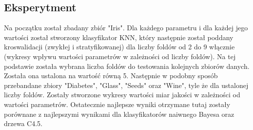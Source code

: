     \subsection{Eksperytment}
        Na początku został zbadany zbiór "Iris". Dla każdego parametru i dla każdej jego wartości został
        stworzony klasyfikator KNN, który następnie został poddany kroswalidacji (zwykłej i stratyfikowanej)
        dla liczby foldów od 2 do 9 włącznie (wykresy wpływu wartości parametrów w zależności od liczby foldów).
        Na tej podstawie została wybrana liczba foldów do testowania kolejnych zbiorów danych. Została ona ustalona
        na wartość równą 5. Następnie w podobny sposób przebandane zbiory "Diabetes", "Glass", "Seeds" oraz "Wine",
        tyle że dla ustalonej liczby foldów. Zostały stworzone wykresy wartości miar jakości w zależności od wartości
        parametrów. Ostatecznie najlepsze wyniki otrzymane tutaj zostały porównane z najlepszymi wynikami dla klasyfikatorów
        naiwnego Bayesa oraz drzewa C4.5.